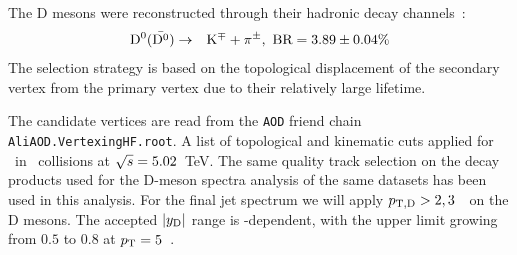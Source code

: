 The D mesons were reconstructed through their hadronic decay channels~\cite{Tanabashi:2018oca}:
\begin{eqnarray*}
\mathrm{D^{0}} (\bar{\mathrm{D^{0}}}) &\to& {\rm K}^{\mp} + \pi^{\pm}  , {\text{ BR}} = 3.89\pm {0.04} \%\\
\end{eqnarray*}
The selection strategy is based on the topological displacement of the secondary vertex from the primary vertex due to their relatively large lifetime.

The candidate vertices are read from the \texttt{AOD} friend chain \texttt{AliAOD.VertexingHF.root}. A list of topological and kinematic cuts applied for \Dzero\ in \pp\ collisions at $\sqrt{s}=5.02$~TeV.
The same quality track selection on the decay products used for the D-meson spectra analysis of the same datasets has been used in this analysis.
For the final jet spectrum we will apply $p_{\mathrm{T,D}}> 2, 3$~\GeVc\ on the D mesons. The accepted $|y_{\rm D}|$ range is \pt-dependent, with the upper limit growing from $0.5$ to $0.8$ at $p_{\rm T}=5$~\GeVc.

